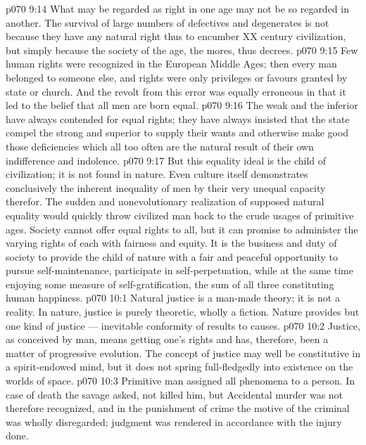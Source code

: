 \vs p070 9:14 What may be regarded as right in one age may not be so regarded in another. The survival of large numbers of defectives and degenerates is not because they have any natural right thus to encumber XX century civilization, but simply because the society of the age, the mores, thus decrees.
\vs p070 9:15 Few human rights were recognized in the European Middle Ages; then every man belonged to someone else, and rights were only privileges or favours granted by state or church. And the revolt from this error was equally erroneous in that it led to the belief that all men are born equal.
\vs p070 9:16 The weak and the inferior have always contended for equal rights; they have always insisted that the state compel the strong and superior to supply their wants and otherwise make good those deficiencies which all too often are the natural result of their own indifference and indolence.
\vs p070 9:17 But this equality ideal is the child of civilization; it is not found in nature. Even culture itself demonstrates conclusively the inherent inequality of men by their very unequal capacity therefor. The sudden and nonevolutionary realization of supposed natural equality would quickly throw civilized man back to the crude usages of primitive ages. Society cannot offer equal rights to all, but it can promise to administer the varying rights of each with fairness and equity. It is the business and duty of society to provide the child of nature with a fair and peaceful opportunity to pursue self\hyp{}maintenance, participate in self\hyp{}perpetuation, while at the same time enjoying some measure of self\hyp{}gratification, the sum of all three constituting human happiness.
\vs p070 10:1 Natural justice is a man\hyp{}made theory; it is not a reality. In nature, justice is purely theoretic, wholly a fiction. Nature provides but one kind of justice --- inevitable conformity of results to causes.
\vs p070 10:2 Justice, as conceived by man, means getting one’s rights and has, therefore, been a matter of progressive evolution. The concept of justice may well be constitutive in a spirit\hyp{}endowed mind, but it does not spring full\hyp{}fledgedly into existence on the worlds of space.
\vs p070 10:3 Primitive man assigned all phenomena to a person. In case of death the savage asked, not  killed him, but  Accidental murder was not therefore recognized, and in the punishment of crime the motive of the criminal was wholly disregarded; judgment was rendered in accordance with the injury done.
